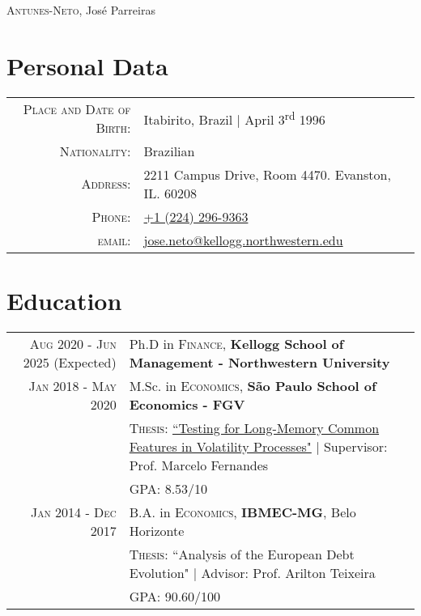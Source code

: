 \documentclass[a4paper,10pt]{article}
\begin{document}
\par{
    \centering
		{\Huge \textsc{Antunes-Neto}, José Parreiras
	}\bigskip\par
}

\section{Personal Data}

\begin{tabular}{rp{9.75cm}}
    \textsc{Place and Date of Birth:} & Itabirito, Brazil  | April 3\textsuperscript{rd}  1996 \\
    \textsc{Nationality:} & Brazilian\\
    \textsc{Address:}   & 2211 Campus Drive, Room 4470. Evanston, IL. 60208\\
    \textsc{Phone:}     & \href{tel:+12242969363}{+1 (224) 296-9363}\\
    \textsc{email:}     & \href{mailto:jose.neto@kellogg.northwestern.edu}{jose.neto@kellogg.northwestern.edu} \\
\end{tabular}


\section{Education}
\begin{tabular}{r|p{8.75cm}}	
    \textsc{Aug} 2020 - \textsc{Jun} 2025 (Expected) & Ph.D in \textsc{Finance}, \normalsize\textbf{Kellogg School of Management - Northwestern University} \\
    \textsc{Jan} 2018 - \textsc{May} 2020 & M.Sc. in \textsc{Economics}, \normalsize\textbf{São Paulo School of Economics - FGV} \\
    & \normalsize \textsc{Thesis}: \href{http://hdl.handle.net/10438/29188}{``Testing for Long-Memory Common Features in Volatility Processes"} | \small Supervisor: Prof. Marcelo Fernandes \\ 
    &\normalsize \textsc{GPA}: 8.53/10
    \\
    \textsc{Jan} 2014 - \textsc{Dec} 2017& B.A. in \textsc{Economics}, \normalsize\textbf{IBMEC-MG}, Belo Horizonte \\
    & \normalsize \textsc{Thesis}: ``Analysis of the European Debt Evolution" | \small Advisor: Prof. Arilton Teixeira \\
    &\normalsize \textsc{GPA}: 90.60/100
\end{tabular}
\end{document}
